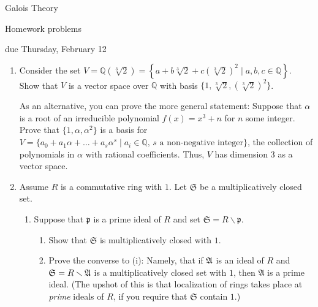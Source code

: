 \documentclass[11pt]{report}
\newcommand\QQ{\mathbb Q}
\newcommand\gen{\sqrt[3]{2}}
\begin{document}
\thispagestyle{empty}

\begin{center}
{\sc Galois Theory

\smallskip

Homework problems

\smallskip

due Thursday, February 12}

\end{center}

\bigskip

\begin{enumerate}

\item Consider the set $V = \QQ(\gen) = \left\{ a + b \gen + c {(\gen)}^2 \mid a, b, c \in \QQ \right\}$.
Show that $V$ is a vector space over $\QQ$ with basis $\{1, \gen, {(\gen)}^2 \}$.

\smallskip

As an alternative, you can prove the more general statement:  Suppose that $\alpha$ is a root 
of an irreducible polynomial $f(x) = x^3 + n$ for $n$ some integer.   Prove that $\{1, \alpha,
\alpha^2 \}$ is a basis for $V = \{ a_0 + a_1 \alpha + \dots + a_s \alpha^s \mid a_i \in \QQ, \, 
s \text{ a non-negative integer} \}$,
the collection of polynomials in $\alpha$ with rational coefficients.  Thus, $V$ has
dimension $3$ as a vector space.

\item Assume $R$ is a commutative ring with $1$.  Let $\mathfrak{S}$ be a multiplicatively
closed set.  

\begin{enumerate}

\item Suppose that $\mathfrak{p}$ is a prime ideal of $R$ and set $\mathfrak{S} = 
R \smallsetminus \mathfrak{p}$.

\begin{enumerate}

\item Show that $\mathfrak S$ is multiplicatively closed with $1$.

\item Prove the converse to (i):  Namely, that if $\frak A$ is an ideal of
$R$ and $\mathfrak S = R \smallsetminus \frak{A}$ is a multiplicatively
closed set with $1$, then $\mathfrak{A}$ is a prime ideal.
(The upshot of this is that localization of rings takes place at
\emph{prime} ideals of $R$, if you require that $\mathfrak S$ contain
$1$.)


\end{enumerate}
\end{enumerate}
\end{enumerate}
\end{document}
